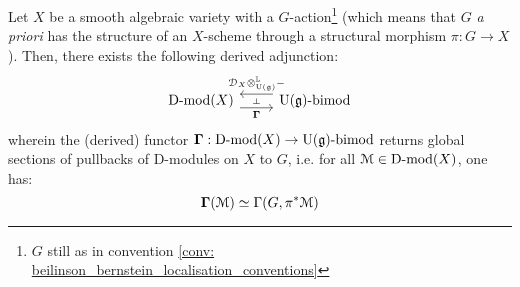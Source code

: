             \begin{theorem} \label{theorem: localisation_adjunction_for_D_modules}
                Let $X$ be a smooth algebraic variety with a $G$-action\footnote{$G$ still as in convention \ref{conv: beilinson_bernstein_localisation_conventions}} (which means that $G$ \textit{a priori} has the structure of an $X$-scheme through a structural morphism $\pi: G \to X$). Then, there exists the following derived adjunction:
                    $$
                        \begin{tikzcd}
                        	{\Dmod(X)} & {\U(\g)\bimod}
                        	\arrow[""{name=0, anchor=center, inner sep=0}, "{\bfGamma}"', shift right=2, from=1-1, to=1-2]
                        	\arrow[""{name=1, anchor=center, inner sep=0}, "{\D_X \tensor^{\L}_{\U(\g)} -}"', shift right=2, from=1-2, to=1-1]
                        	\arrow["\dashv"{anchor=center, rotate=-90}, draw=none, from=1, to=0]
                        \end{tikzcd}
                    $$
                wherein the (derived) functor $\mathbf{\Gamma}: \mathrm{D}\text{-}\mathrm{mod}(X) \to \mathrm{U}(\mathfrak{g})\text{-}\mathrm{bimod}$ returns global sections of pullbacks of D-modules on $X$ to $G$, i.e. for all $\mathcal{M} \in \mathrm{D}\text{-}\mathrm{mod}(X)$, one has:
                    $$\mathbf{\Gamma}(\mathcal{M}) \simeq \Gamma(G, \pi^*\mathcal{M})$$
            \end{theorem}

